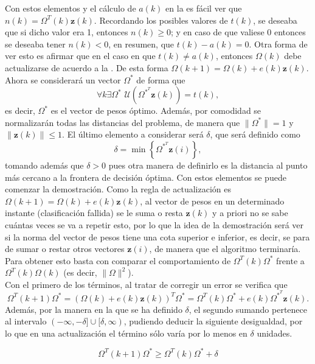 		Con estos elementos y el cálculo de $a(k)$ en la  es fácil ver que $n(k) = \Omega^T(k)\textbf{z}(k)$. Recordando los posibles valores de $t(k)$, se deseaba que si dicho valor era 1, entonces $n(k) \geq 0$; y en caso de que valiese 0 entonces se deseaba tener $n(k) < 0$, en resumen, que $t(k) - a(k) = 0$. Otra forma de ver esto es afirmar que en el caso en que $t(k) \neq a(k)$, entonces $\Omega(k)$ debe actualizarse de acuerdo a la . De esta forma $\Omega(k + 1) = \Omega(k) + e(k)\textbf{z}(k)$. Ahora se considerará un vector $\Omega^*$ de forma que 
		$$
		\forall k \exists \Omega^* \,\, \mathcal{U}\left(\Omega^{*^T}\textbf{z}(k)\right) = t(k),
		$$
		es decir, $\Omega^*$ es el vector de pesos óptimo. Además, por comodidad se normalizarán todas las distancias del problema, de manera que $\|\Omega^{*}\| = 1$ y $\|\textbf{z}(k)\| \leq 1$. El último elemento a considerar será $\delta$, que será definido como
		$$
		\delta = \min\left\lbrace\Omega^{*^T}\textbf{z}(i)\right\rbrace, 
		$$
		tomando además que $\delta > 0$ pues otra manera de definirlo es la distancia al punto más cercano a la frontera de decisión óptima. Con estos elementos se puede comenzar la demostración. Como la regla de actualización es $\Omega(k + 1) = \Omega(k) + e(k)\textbf{z}(k)$, al vector de pesos en un determinado instante (clasificación fallida) se le suma o resta $\textbf{z}(k)$ y a priori no se sabe cuántas veces se va a repetir esto, por lo que la idea de la demostración será ver si la norma del vector de pesos tiene una cota superior e inferior, es decir, se para de sumar o restar otros vectores $\textbf{z}(i)$, de manera que el algoritmo terminaría. Para obtener esto basta con comparar el comportamiento de $\Omega^T(k) \Omega^*$ frente a $\Omega^T(k)\Omega(k)$ (es decir, $\|\Omega\|^2$). \\
		
		Con el primero de los términos, al tratar de corregir un error se verifica que
		$$
		\Omega^T(k+1)\Omega^* = (\Omega(k) + e(k)\textbf{z}(k))^T \Omega^* = \Omega^T(k)\Omega^* + e(k)\Omega^{*^T}\textbf{z}(k). 
		$$
		Además, por la manera en la que se ha definido $\delta$, el segundo sumando pertenece al intervalo $(-\infty, -\delta] \cup [\delta, \infty)$, pudiendo deducir la siguiente desigualdad, por lo que en una actualización el término sólo varía por lo menos en $\delta$ unidades.  
		
		\begin{equation}
			\label{eq:inf_delta}
			\Omega^T(k+1)\Omega^* \geq \Omega^T(k)\Omega^* + \delta
		\end{equation}
		
